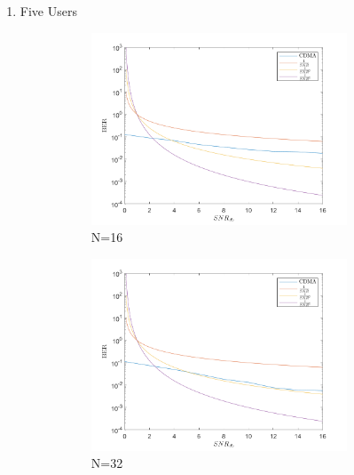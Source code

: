 \documentclass[12pt]{article}
\begin{document}
\begin{enumerate}
\begin{enumerate}
\begin{enumerate}
							\newpage
							\item Five Users
							\begin{figure}[h!]
								\centering
								\begin{subfigure}[b]{0.4\textwidth}
									\centering
									\includegraphics[width=0.9\textwidth]{fig7.png}
									\caption{N=16}
								\end{subfigure}
								\begin{subfigure}[b]{0.4\textwidth}
									\centering
									\includegraphics[width=0.9\textwidth]{fig8.png}
									\caption{N=32}
								\end{subfigure}
								\begin{subfigure}[b]{0.4\textwidth}
									\centering

\end{subfigure}
\end{figure}
\end{enumerate}
\end{enumerate}
\end{enumerate}
\end{document}
